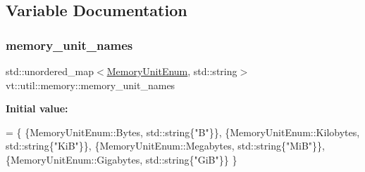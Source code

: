\subsection{Variable Documentation}
\mbox{\label{namespacevt_1_1util_1_1memory_aa772e07fd4860ed4086654c53eed51c2}} 
\subsubsection{\texorpdfstring{memory\+\_\+unit\+\_\+names}{memory\_unit\_names}}
{\footnotesize\ttfamily std\+::unordered\+\_\+map$<$\hyperlink{namespacevt_1_1util_1_1memory_a64df3d84293b34009f78e2a1db2f9bb6}{Memory\+Unit\+Enum}, std\+::string$>$ vt\+::util\+::memory\+::memory\+\_\+unit\+\_\+names}

{\bfseries Initial value\+:}
\begin{DoxyCode}
= \{
  \{MemoryUnitEnum::Bytes,     std::string\{\textcolor{stringliteral}{"B"}\}\},
  \{MemoryUnitEnum::Kilobytes, std::string\{\textcolor{stringliteral}{"KiB"}\}\},
  \{MemoryUnitEnum::Megabytes, std::string\{\textcolor{stringliteral}{"MiB"}\}\},
  \{MemoryUnitEnum::Gigabytes, std::string\{\textcolor{stringliteral}{"GiB"}\}\}
\}
\end{DoxyCode}
